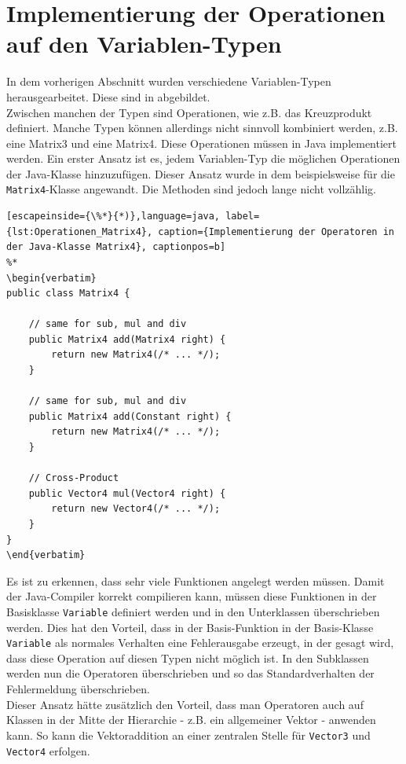 \section{Implementierung der Operationen auf den Variablen-Typen}
In dem vorherigen Abschnitt wurden verschiedene Variablen-Typen herausgearbeitet.
Diese sind in  abgebildet.\\
Zwischen manchen der Typen sind Operationen, wie z.B. das Kreuzprodukt definiert.
Manche Typen können allerdings nicht sinnvoll kombiniert werden, z.B. eine Matrix3 und eine Matrix4.
Diese Operationen müssen in Java implementiert werden.
Ein erster Ansatz ist es, jedem Variablen-Typ die möglichen Operationen der Java-Klasse hinzuzufügen.
Dieser Ansatz wurde in dem  beispielsweise für die \texttt{Matrix4}-Klasse angewandt. Die Methoden sind jedoch lange nicht vollzählig.
\begin{lstlisting}[escapeinside={\%*}{*)},language=java, label={lst:Operationen_Matrix4}, caption={Implementierung der Operatoren in der Java-Klasse Matrix4}, captionpos=b]
%*
\begin{verbatim}
public class Matrix4 {

	// same for sub, mul and div
	public Matrix4 add(Matrix4 right) {
		return new Matrix4(/* ... */);
	}

	// same for sub, mul and div
	public Matrix4 add(Constant right) {
		return new Matrix4(/* ... */);
	}

	// Cross-Product
	public Vector4 mul(Vector4 right) {
		return new Vector4(/* ... */);
	}
}
\end{verbatim}
\end{lstlisting}
Es ist zu erkennen, dass sehr viele Funktionen angelegt werden müssen.
Damit der Java-Compiler korrekt compilieren kann, müssen diese Funktionen in der Basisklasse \texttt{Variable} definiert werden und in den Unterklassen überschrieben werden.
Dies hat den Vorteil, dass in der Basis-Funktion in der Basis-Klasse \texttt{Variable} als normales Verhalten eine Fehlerausgabe erzeugt, in der gesagt wird, dass diese Operation auf diesen Typen nicht möglich ist.
In den Subklassen werden nun die Operatoren überschrieben und so das Standardverhalten der Fehlermeldung überschrieben.\\
Dieser Ansatz hätte zusätzlich den Vorteil, dass man Operatoren auch auf Klassen in der Mitte der Hierarchie - z.B. ein allgemeiner Vektor - anwenden kann. So kann die Vektoraddition an einer zentralen Stelle für \texttt{Vector3} und \texttt{Vector4} erfolgen.\\

